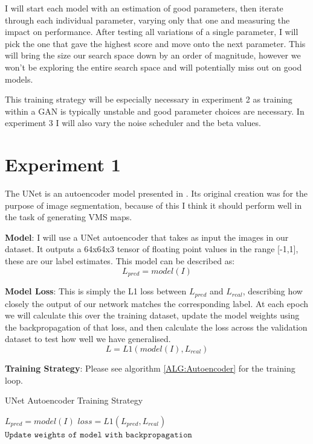 \documentclass{UoYCSproject}
\begin{document}
I will start each model with an estimation of good parameters, then iterate through each individual parameter, varying only that one and measuring the impact on performance. After testing all variations of a single parameter, I will pick the one that gave the highest score and move onto the next parameter. This will bring the size our search space down by an order of magnitude, however we won't be exploring the entire search space and will potentially miss out on good models. 


This training strategy will be especially necessary in experiment 2 as training within a GAN is typically unstable and good parameter choices are necessary. In experiment 3 I will also vary the noise scheduler and the beta values.

\section{Experiment 1}

The UNet is an autoencoder model presented in \cite{ronneberger2015unet}. Its original creation was for the purpose of image segmentation, because of this I think it should perform well in the task of generating VMS maps.

\textbf{Model}: I will use a UNet autoencoder that takes as input the images in our dataset.
It outputs a 64x64x3 tensor of floating point values in the range [-1,1], these are our label estimates.
This model can be described as: \[ L_{pred} = model(I) \]

\textbf{Model Loss}: This is simply the L1 loss between $L_{pred}$ and $L_{real}$, describing how closely the output of our network matches the corresponding label. At each epoch we will calculate this over the training dataset, update the model weights using the backpropagation of that loss, and then calculate the loss across the validation dataset to test how well we have generalised.
\[ L = L1( model(I), L_{real} ) \]

\textbf{Training Strategy}: Please see algorithm \ref{ALG:Autoencoder} for the training loop.

\begin{algorithm}
\caption{UNet Autoencoder Training Strategy}\label{ALG:Autoencoder}
\begin{algorithmic}[1]
\State
\State $L_{pred} = model(I)$
\State $loss = L1( L_{pred}, L_{real} ) $
\State $\texttt{Update weights of model with backpropagation}$
\State
\EndFor
\EndFor
\end{algorithmic}
\end{algorithm}
\end{document}
